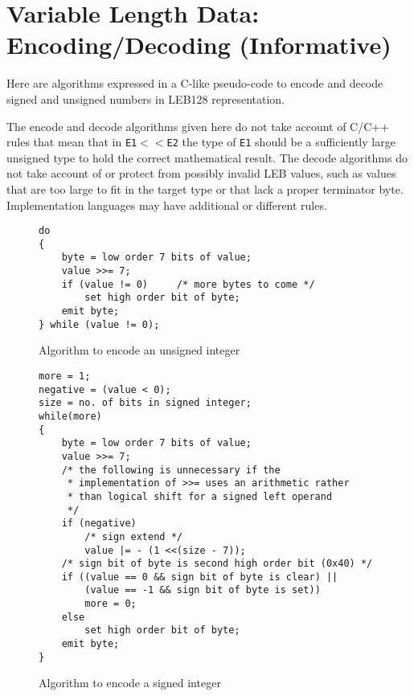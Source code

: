 
\chapter[Encoding/Decoding (Informative)]{Variable Length Data: Encoding/Decoding (Informative)}
\label{app:variablelengthdataencodingdecodinginformative}

Here are algorithms expressed in a C-like pseudo-code to
encode and decode signed and unsigned numbers in LEB128
representation.

The encode and decode algorithms given here do not take account of C/C++ rules
that mean that in \texttt{E1}$ << $\texttt{E2} the type of \texttt{E1} should be
a sufficiently large unsigned type to hold the correct mathematical result.
The decode algorithms do not take account of
or protect from possibly invalid LEB values, such as values
that are too large to fit in the target type or that
lack a proper terminator byte.
Implementation languages may have additional or different rules.

\vspace{2cm}

\begin{figure}[hb]
\begin{lstlisting}
do
{
    byte = low order 7 bits of value;
    value >>= 7;
    if (value != 0)     /* more bytes to come */
        set high order bit of byte;
    emit byte;
} while (value != 0);
\end{lstlisting}
\caption{Algorithm to encode an unsigned integer}
\end{figure}

\begin{figure}[ht]
\begin{lstlisting}
more = 1;
negative = (value < 0);
size = no. of bits in signed integer;
while(more)
{
    byte = low order 7 bits of value;
    value >>= 7;
    /* the following is unnecessary if the
     * implementation of >>= uses an arithmetic rather
     * than logical shift for a signed left operand
     */
    if (negative)
        /* sign extend */
        value |= - (1 <<(size - 7));
    /* sign bit of byte is second high order bit (0x40) */
    if ((value == 0 && sign bit of byte is clear) ||
        (value == -1 && sign bit of byte is set))
        more = 0;
    else
        set high order bit of byte;
    emit byte;
}
\end{lstlisting}
\caption{Algorithm to encode a signed integer}
\end{figure}

